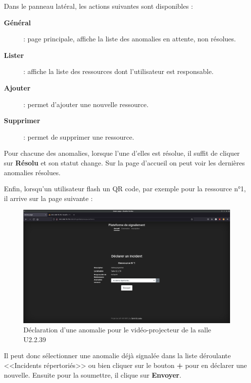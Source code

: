 Dans le panneau latéral, les actions suivantes sont disponibles :
\begin{description}
    \item[\textbf{Général}] : page principale, affiche la liste des anomalies en attente, non
        résolues.
    \item[\textbf{Lister}] : affiche la liste des ressources dont l'utilisateur est responsable.
    \item[\textbf{Ajouter}] : permet d'ajouter une nouvelle ressource.
    \item[\textbf{Supprimer}] : permet de supprimer une ressource.
\end{description}
Pour chacune des anomalies, lorsque l'une d'elles est résolue, il suffit de cliquer sur
\textbf{Résolu} et son statut change. Sur la page d'accueil on peut voir les dernières anomalies
résolues.
\newpage

Enfin, lorsqu'un utilisateur flash un QR code, par exemple pour la ressource n°1, il arrive sur
la page suivante :
\begin{figure}[!h]
    \centering
    \includegraphics[width=\textwidth]{img/ressource.png}
    \caption{Déclaration d'une anomalie pour le vidéo-projecteur de la salle U2.2.39}
\end{figure}
Il peut donc sélectionner une anomalie déjà signalée dans la liste déroulante
<<Incidents répertoriés>> ou bien cliquer sur le bouton \textbf{+} pour en déclarer une nouvelle.
Ensuite pour la soumettre, il clique sur \textbf{Envoyer}.

